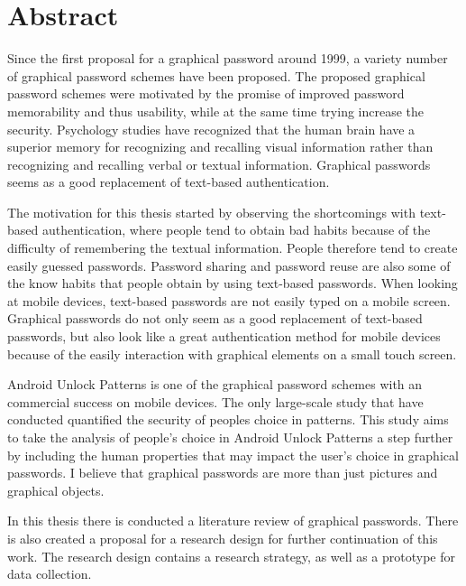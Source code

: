 \section*{Abstract}
  
  Since the first proposal for a graphical password around 1999, a variety number of graphical password schemes have been proposed. The proposed graphical password schemes were motivated by the promise of improved password memorability and thus usability, while at the same time trying increase the security.  Psychology studies have recognized that the human brain have a superior memory for recognizing and recalling visual information rather than recognizing and recalling verbal or textual information. Graphical passwords seems as a good replacement of text-based authentication. 

  The motivation for this thesis started by observing the shortcomings with text-based authentication, where people tend to obtain bad habits because of the difficulty of remembering the textual information. People therefore tend to create easily guessed passwords. Password sharing and password reuse are also some of the know habits that people obtain by using text-based passwords. When looking at mobile devices, text-based passwords are not easily typed on a mobile screen. Graphical passwords do not only seem as a good replacement of text-based passwords, but also look like a great authentication method for mobile devices because of the easily interaction with graphical elements on a small touch screen. 

  Android Unlock Patterns is one of the graphical password schemes with an commercial success on mobile devices. The only large-scale study that have conducted quantified the security of peoples choice in patterns. This study aims to take the analysis of people's choice in Android Unlock Patterns a step further by including the human properties that may impact the user's choice in graphical passwords. I believe that graphical passwords are more than just pictures and graphical objects.

  In this thesis there is conducted a literature review of graphical passwords. There is also created a proposal for a research design for further continuation of this work. The research design contains a research strategy, as well as a prototype for data collection. 

  